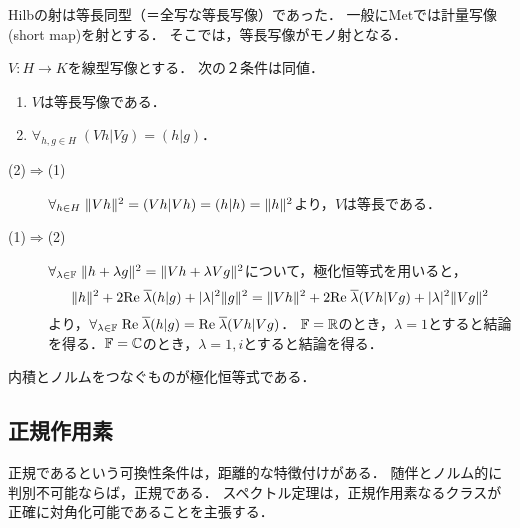 \documentclass[uplatex,dvipdfmx]{jsreport}
\begin{document}
\begin{tcolorbox}[colframe=ForestGreen, colback=ForestGreen!10!white,breakable,colbacktitle=ForestGreen!40!white,coltitle=black,fonttitle=\bfseries\sffamily,
title=]
    Hilbの射は等長同型（＝全写な等長写像）であった．
    一般にMetでは計量写像(short map)を射とする．
    そこでは，等長写像がモノ射となる．
\end{tcolorbox}

\begin{proposition}[モノ射の内積による特徴付け]\label{prop-characterization-of-isometry}
    $V:H\to K$を線型写像とする．
    次の２条件は同値．
    \begin{enumerate}
        \item $V$は等長写像である．
        \item $\forall_{h,g\in H}\;(Vh|Vg)=(h|g)$．
    \end{enumerate}
\end{proposition}
\begin{Proof}\mbox{}
    \begin{description}
        \item[(2)$\Rightarrow$(1)] $\forall_{h\in H}\;\|Vh\|^2=(Vh|Vh)=(h|h)=\|h\|^2$より，$V$は等長である．
        \item[(1)$\Rightarrow$(2)] $\forall_{\lambda\in\mathbb{F}}\;\|h+\lambda g\|^2=\|Vh+\lambda Vg\|^2$について，極化恒等式を用いると，
        \[\|h\|^2+2\mathrm{Re}\;\overline{\lambda}(h|g)+\lvert\lambda\rvert^2\|g\|^2=\|Vh\|^2+2\mathrm{Re}\;\overline{\lambda}(Vh|Vg)+\lvert\lambda\rvert^2\|Vg\|^2\]
        より，$\forall_{\lambda\in\mathbb{F}}\;\mathrm{Re}\;\overline{\lambda}(h|g)=\mathrm{Re}\;\overline{\lambda}(Vh|Vg)$．
        $\mathbb{F}=\mathbb{R}$のとき，$\lambda=1$とすると結論を得る．$\mathbb{F}=\mathbb{C}$のとき，$\lambda=1,i$とすると結論を得る．
    \end{description}
\end{Proof}
\begin{remarks}
    内積とノルムをつなぐものが極化恒等式である．
\end{remarks}

\subsection{正規作用素}

\begin{tcolorbox}[colframe=ForestGreen, colback=ForestGreen!10!white,breakable,colbacktitle=ForestGreen!40!white,coltitle=black,fonttitle=\bfseries\sffamily,
title=]
    正規であるという可換性条件は，距離的な特徴付けがある．
    随伴とノルム的に判別不可能ならば，正規である．
    スペクトル定理は，正規作用素なるクラスが正確に対角化可能であることを主張する．
\end{tcolorbox}
\end{document}
